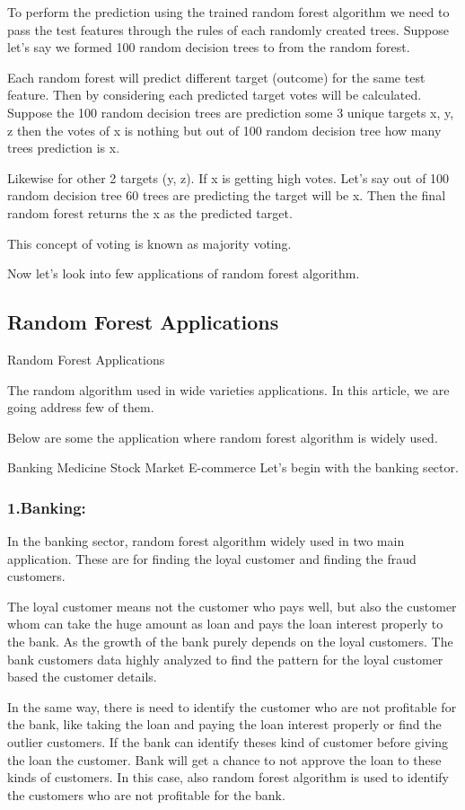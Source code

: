 \documentclass[a4paper,12pt]{article}
\begin{document}
To perform the prediction using the trained random forest algorithm we need to pass the test features through the rules of each randomly created trees. Suppose let’s say we formed 100 random decision trees to from the random forest.

Each random forest will predict different target (outcome) for the same test feature. Then by considering each predicted target votes will be calculated. Suppose the 100 random decision trees are prediction some 3 unique targets x, y, z then the votes of x is nothing but out of 100 random decision tree how many trees prediction is x.

Likewise for other 2 targets (y, z). If x is getting high votes. Let’s say out of 100 random decision tree 60 trees are predicting the target will be x. Then the final random forest returns the x as the predicted target.

This concept of voting is known as majority voting.

Now let’s look into few applications of random forest algorithm.


\subsection*{Random Forest Applications}
Random Forest Applications

The random algorithm used in wide varieties applications. In this article, we are going address few of them.

Below are some the application where random forest algorithm is widely used.

Banking
Medicine
Stock Market
E-commerce
Let’s begin with the banking sector.

\subsubsection*{1.Banking:}
In the banking sector, random forest algorithm widely used in two main application. These are for finding the loyal customer and finding the fraud customers.

The loyal customer means not the customer who pays well, but also the customer whom can take the huge amount as loan and pays the loan interest properly to the bank. As the growth of the bank purely depends on the loyal customers. The bank customers data highly analyzed to find the pattern for the loyal customer based the customer details.

In the same way, there is need to identify the customer who are not profitable for the bank, like taking the loan and paying the loan interest properly or find the outlier customers. If the bank can identify theses kind of customer before giving the loan the customer.  Bank will get a chance to not approve the loan to these kinds of customers. In this case, also random forest algorithm is used to identify the customers who are not profitable for the bank.
\end{document}
